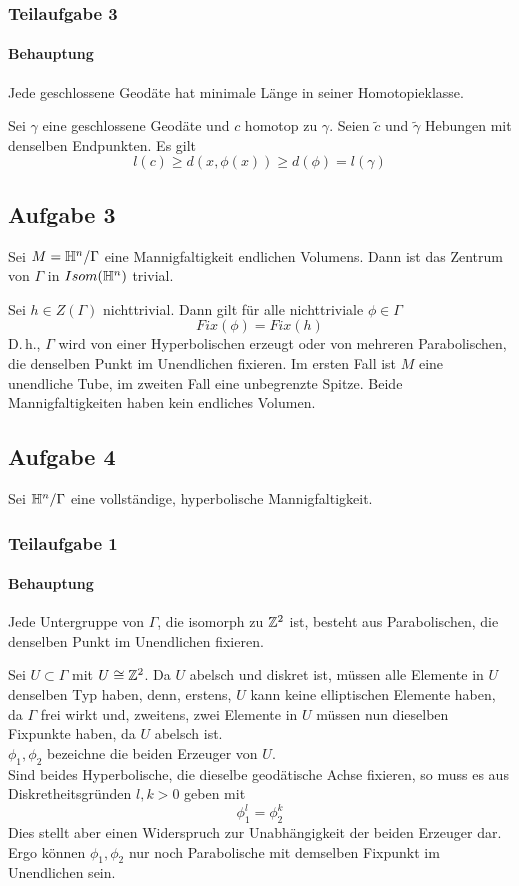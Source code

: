 \documentclass{book}
\begin{document}
\subsubsection{Teilaufgabe 3}
\paragraph{Behauptung}
Jede geschlossene Geodäte hat minimale Länge in seiner Homotopieklasse.
\begin{Beweis}{}
	Sei $\gamma$ eine geschlossene Geodäte und $c$ homotop zu $\gamma$. Seien $\widetilde{c}$ und $\widetilde{\gamma}$ Hebungen mit denselben Endpunkten. Es gilt
	\[ l(c) \geq d(x,\phi(x)) \geq d(\phi) = l(\gamma) \]
\end{Beweis}

\subsection{Aufgabe 3}
Sei $M = \mathbb{H}^n / \Gamma$ eine Mannigfaltigkeit endlichen Volumens. Dann ist das Zentrum von $\Gamma$ in $Isom(\mathbb{H}^n)$ trivial.
\begin{Beweis}{}
	Sei $h \in Z(\Gamma)$ nichttrivial. Dann gilt für alle nichttriviale $\phi \in \Gamma$
	\[ Fix(\phi) = Fix(h) \]
	D.\,h., $\Gamma$ wird von einer Hyperbolischen erzeugt oder von mehreren Parabolischen, die denselben Punkt im Unendlichen fixieren. Im ersten Fall ist $M$ eine unendliche Tube, im zweiten Fall eine unbegrenzte Spitze. Beide Mannigfaltigkeiten haben kein endliches Volumen.
\end{Beweis}

\subsection{Aufgabe 4}
Sei $\mathbb{H}^n / \Gamma$ eine vollständige, hyperbolische Mannigfaltigkeit.
\subsubsection{Teilaufgabe 1}
\paragraph{Behauptung}
Jede Untergruppe von $\Gamma$, die isomorph zu $\mathbb{Z}^2$ ist, besteht aus Parabolischen, die denselben Punkt im Unendlichen fixieren.
\begin{Beweis}{}
	Sei $U \subset \Gamma$ mit $U \overset{}{\cong} \mathbb{Z}^2$. Da $U$ abelsch und diskret ist, müssen alle Elemente in $U$ denselben Typ haben, denn, erstens, $U$ kann keine elliptischen Elemente haben, da $\Gamma$ frei wirkt und, zweitens, zwei Elemente in $U$ müssen nun dieselben Fixpunkte haben, da $U$ abelsch ist.\\
	$\phi_1,\phi_2$ bezeichne die beiden Erzeuger von $U$.\\
	Sind beides Hyperbolische, die dieselbe geodätische Achse fixieren, so muss es aus Diskretheitsgründen $l,k> 0$ geben mit 
	\[ \phi_1^l = \phi_2^k \]
	Dies stellt aber einen Widerspruch zur Unabhängigkeit der beiden Erzeuger dar.\\
	Ergo können $\phi_1, \phi_2$ nur noch Parabolische mit demselben Fixpunkt im Unendlichen sein. 
\end{Beweis}
\end{document}
